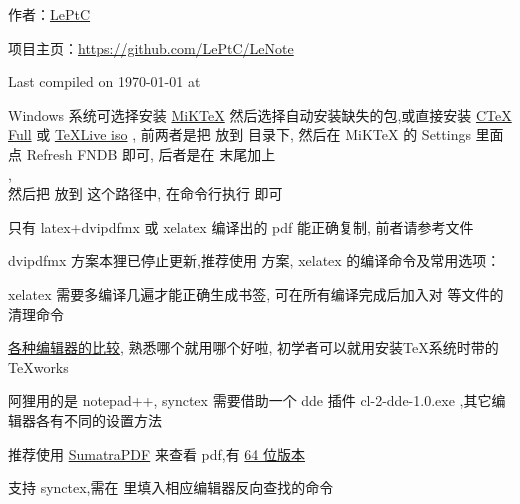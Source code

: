 \documentclass{leptc}
\begin{document}

作者：\href{mailto:alileptc@gmail.com}{LePtC}

项目主页：\url{https://github.com/LePtC/LeNote }

Last compiled on {\yyyymmdddate\today} at \currenttime



Windows 系统可选择安装 
\href{http://miktex.org/download}{MiKTeX}
然后选择自动安装缺失的包,或直接安装 
\href{http://www.ctex.org/CTeXDownload }{CTeX Full} 
或 \href{http://www.ctan.org/tex-archive/systems/texlive/Images/ }{TeXLive iso} ,
前两者是把  放到 
 目录下,
然后在 MiKTeX 的 Settings 里面点 Refresh FNDB 即可,
后者是在  末尾加上 
\\ , 
\\然后把 放到 
 这个路径中,
在命令行执行  即可

只有 latex+dvipdfmx 或 xelatex 编译出的 pdf 能正确复制,
前者请参考文件 

dvipdfmx 方案本狸已停止更新,推荐使用 \XeTeX 方案, 
xelatex 的编译命令及常用选项：


xelatex 需要多编译几遍才能正确生成书签,
可在所有编译完成后加入对
等文件的清理命令


\href{http://tex.stackexchange.com/questions/339/latex-editors-ides }{各种编辑器的比较},
熟悉哪个就用哪个好啦,
初学者可以就用安装\TeX 系统时带的 TeXworks 

阿狸用的是 notepad++, synctex 需要借助一个 dde 插件 
cl-2-dde-1.0.exe ,其它编辑器各有不同的设置方法

 推荐使用 
\href{http://blog.kowalczyk.info/software/sumatrapdf/download-free-pdf-viewer-cn.html }{SumatraPDF} 
来查看 pdf,有 
\href{http://xhmikosr.1f0.de/sumatrapdf/ }{64 位版本}

支持 synctex,需在  里填入相应编辑器反向查找的命令
\end{document}
